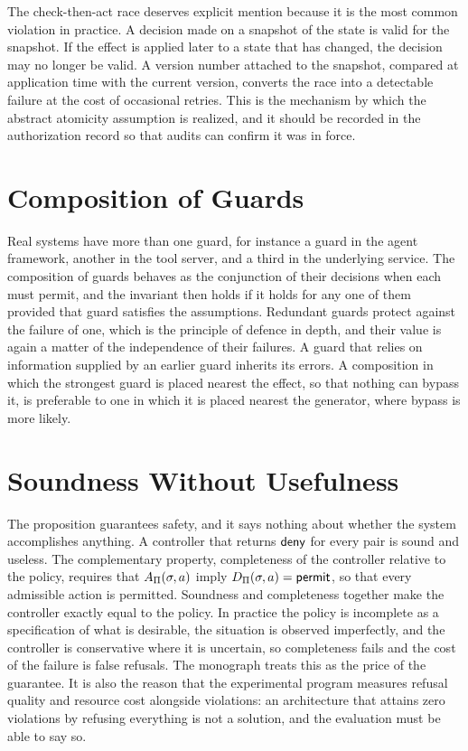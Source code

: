 The check-then-act race deserves explicit mention because it is the most common violation in practice. A decision made on a snapshot of the state is valid for the snapshot. If the effect is applied later to a state that has changed, the decision may no longer be valid. A version number attached to the snapshot, compared at application time with the current version, converts the race into a detectable failure at the cost of occasional retries. This is the mechanism by which the abstract atomicity assumption is realized, and it should be recorded in the authorization record so that audits can confirm it was in force.

\section{Composition of Guards}

Real systems have more than one guard, for instance a guard in the agent framework, another in the tool server, and a third in the underlying service. The composition of guards behaves as the conjunction of their decisions when each must permit, and the invariant then holds if it holds for any one of them provided that guard satisfies the assumptions. Redundant guards protect against the failure of one, which is the principle of defence in depth, and their value is again a matter of the independence of their failures. A guard that relies on information supplied by an earlier guard inherits its errors. A composition in which the strongest guard is placed nearest the effect, so that nothing can bypass it, is preferable to one in which it is placed nearest the generator, where bypass is more likely.

\section{Soundness Without Usefulness}

The proposition guarantees safety, and it says nothing about whether the system accomplishes anything. A controller that returns $\mathsf{deny}$ for every pair is sound and useless. The complementary property, completeness of the controller relative to the policy, requires that $A_\Pi(\sigma,a)$ imply $D_\Pi(\sigma,a)=\mathsf{permit}$, so that every admissible action is permitted. Soundness and completeness together make the controller exactly equal to the policy. In practice the policy is incomplete as a specification of what is desirable, the situation is observed imperfectly, and the controller is conservative where it is uncertain, so completeness fails and the cost of the failure is false refusals. The monograph treats this as the price of the guarantee. It is also the reason that the experimental program measures refusal quality and resource cost alongside violations: an architecture that attains zero violations by refusing everything is not a solution, and the evaluation must be able to say so.

